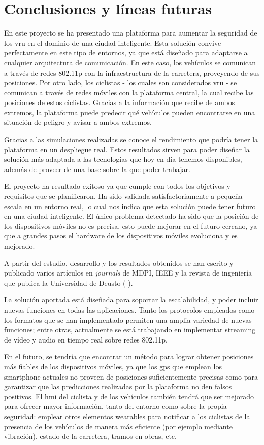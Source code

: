 \chapter{Conclusiones y líneas futuras}
En este proyecto se ha presentado una plataforma para aumentar la seguridad de
los \gls{vru} en el dominio de una ciudad inteligente. Esta solución convive
perfectamente en este tipo de entornos, ya que está diseñado para adaptarse a
cualquier arquitectura de comunicación. En este caso, los vehículos se
comunican a través de redes \gls{802.11p} con la infraestructura de la
carretera, proveyendo de sus posiciones. Por otro lado, los ciclistas - los
cuales son considerados \gls{vru} - se comunican a través de redes móviles con
la plataforma central, la cual recibe las posiciones de estos ciclistas.
Gracias a la información que recibe de ambos extremos, la plataforma puede
predecir qué vehículos pueden encontrarse en una situación de peligro y avisar
a ambos extremos.

Gracias a las simulaciones realizadas se conoce el rendimiento que podría tener
la plataforma en un despliegue real. Estos resultados sirven para poder diseñar
la solución más adaptada a las tecnologías que hoy en día tenemos disponibles,
además de proveer de una base sobre la que poder trabajar.

El proyecto ha resultado exitoso ya que cumple con todos los objetivos y
requisitos que se planificaron. Ha sido validada satisfactoriamente a pequeña
escala en un entorno real, lo cual nos indica que esta solución puede tener
futuro en una ciudad inteligente. El único problema detectado ha sido que la
posición de los dispositivos móviles no es precisa, esto puede mejorar en el
futuro cercano, ya que a grandes pasos el hardware de los dispositivos móviles
evoluciona y es mejorado.

A partir del estudio, desarrollo y los resultados obtenidos se han escrito
y publicado varios artículos en \emph{journals} de MDPI, IEEE y la revista
de ingeniería que publica la Universidad de Deusto (\cite{16}-\cite{19}).

La solución aportada está diseñada para soportar la escalabilidad, y poder
incluir nuevas funciones en todas las aplicaciones. Tanto los protocolos
empleados como los formatos que se han implementado permiten una amplia
variedad de nuevas funciones; entre otras, actualmente se está trabajando en
implementar streaming de vídeo y audio en tiempo real sobre redes \gls{802.11p}.

En el futuro, se tendría que encontrar un método para lograr obtener posiciones
más fiables de los dispositivos móviles, ya que los \gls{gps} que emplean los
smartphone actuales no proveen de posiciones suficientemente precisas como para
garantizar que las predicciones realizadas por la plataforma no den falsos
positivos. El \gls{hmi} del ciclista y de los vehículos también tendrá que ser
mejorado para ofrecer mayor información, tanto del entorno como sobre la propia
seguridad: emplear otros elementos wearables para notificar a los ciclistas de
la presencia de los vehículos de manera más eficiente (por ejemplo mediante
vibración), estado de la carretera, tramos en obras, etc.
